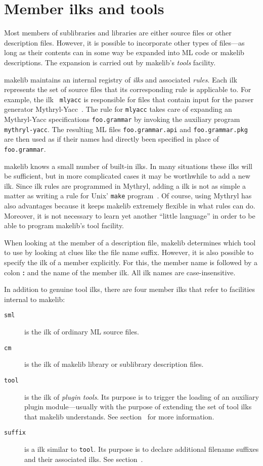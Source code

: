 
\section{Member ilks and tools}
\label{sec:ilks}

Most members of sublibraries and libraries are either source files or
other description files.  However, it is possible to incorporate other
types of files---as long as their contents can in some way be expanded
into ML code or makelib descriptions.  The expansion is carried out by makelib's
{\it tools} facility.

makelib maintains an internal registry of {\em ilks} and associated {\em
rules}.  Each ilk represents the set of source files that its
corresponding rule is applicable to.  For example, the ilk {\tt
mlyacc} is responsible for files that contain input for the parser
generator Mythryl-Yacc~\cite{tarditi90:yacc}.  The rule for {\tt mlyacc}
takes care of expanding an Mythryl-Yacc specifications {\tt foo.grammar} by
invoking the auxiliary program {\tt mythryl-yacc}.  The resulting ML files
{\tt foo.grammar.api} and {\tt foo.grammar.pkg} are then used as if their
names had directly been specified in place of {\tt foo.grammar}.

makelib knows a small number of built-in ilks.  In many situations these
ilks will be sufficient, but in more complicated cases it may be
worthwhile to add a new ilk.  Since ilk rules are programmed in
Mythryl, adding a ilk is not as simple a matter as writing a rule for
{\sc Unix}' {\tt make} program~\cite{feldman79}.  Of course,
using Mythryl has also advantages because it keeps makelib extremely flexible in
what rules can do.  Moreover, it is not necessary to learn yet another
``little language'' in order to be able to program makelib's tool facility.

When looking at the member of a description file, makelib determines which
tool to use by looking at clues like the file name suffix.  However,
it is also possible to specify the ilk of a member explicitly.  For
this, the member name is followed by a colon {\bf :} and the name of
the member ilk.  All ilk names are case-insensitive.

In addition to genuine tool ilks, there are four member ilks
that refer to facilities internal to makelib:
\begin{description}
\item[{\tt sml}] is the ilk of ordinary ML source files.
\item[{\tt cm}] is the ilk of makelib library or sublibrary description files.
\item[{\tt tool}] is the ilk of {\em plugin tools}.  Its purpose is
to trigger the loading of an auxiliary plugin module---usually with the
purpose of extending the set of tool ilks that makelib understands.
See section~ for more information.
\item[{\tt suffix}] is a ilk similar to {\tt tool}.  Its purpose is
to declare additional filename suffixes and their associated ilks.
See section~.
\end{description}


